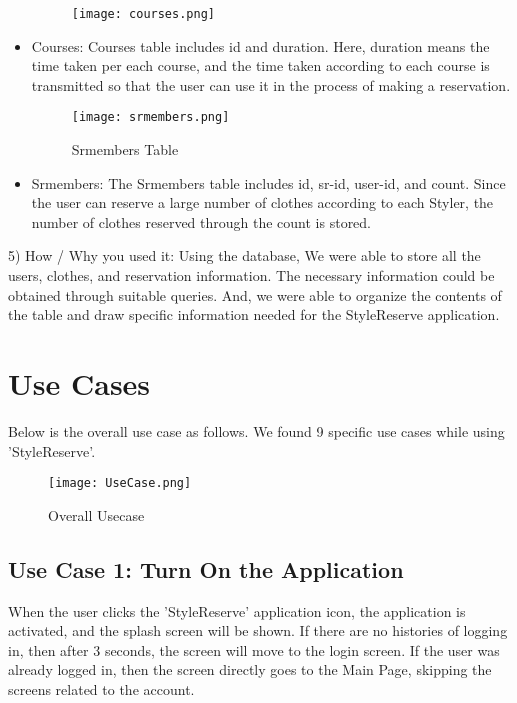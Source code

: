 \documentclass[conference]{IEEEtran}
\begin{document}
\begin{itemize}
    \begin{figure}[htbp]
    \centerline{\texttt{[image: courses.png]}}
    \label{fig}
    \end{figure}
    \item Courses: Courses table includes id and duration. Here, duration means the time taken per each course, and the time taken according to each course is transmitted so that the user can use it in the process of making a reservation.\\
    
    \newpage
    \begin{figure}[htbp]
    \centerline{\texttt{[image: srmembers.png]}}
    \label{fig}
    \caption{Srmembers Table}
    \end{figure}
    \item Srmembers: The Srmembers table includes id, sr-id, user-id, and count. Since the user can reserve a large number of clothes according to each Styler, the number of clothes reserved through the count is stored.\\
\end{itemize}

5) How / Why you used it: Using the database, We were able to store all the users, clothes, and reservation information. The necessary information could be obtained through suitable queries. And, we were able to organize the contents of the table and draw specific information needed for the StyleReserve application.\\

\section{Use Cases}
Below is the overall use case as follows. We found 9 specific use cases while using 'StyleReserve'.\\

\begin{figure}[htbp]
\centerline{\texttt{[image: UseCase.png]}}
\label{fig}
\caption{Overall Usecase}
\end{figure}

\subsection{Use Case 1: Turn On the Application}
When the user clicks the 'StyleReserve' application icon, the application is activated, and the splash screen will be shown. If there are no histories of logging in, then after 3 seconds, the screen will move to the login screen. If the user was already logged in, then the screen directly goes to the Main Page, skipping the screens related to the account.\\
    
\end{document}
